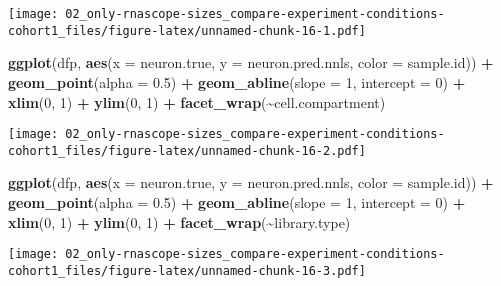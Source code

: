 \documentclass[
]{article}
\newenvironment{Shaded}{\begin{snugshade}}{\end{snugshade}}
\newcommand{\AttributeTok}[1]{\textcolor[rgb]{0.13,0.29,0.53}{#1}}
\newcommand{\DecValTok}[1]{\textcolor[rgb]{0.00,0.00,0.81}{#1}}
\newcommand{\FloatTok}[1]{\textcolor[rgb]{0.00,0.00,0.81}{#1}}
\newcommand{\FunctionTok}[1]{\textcolor[rgb]{0.13,0.29,0.53}{\textbf{#1}}}
\newcommand{\NormalTok}[1]{#1}
\newcommand{\SpecialCharTok}[1]{\textcolor[rgb]{0.81,0.36,0.00}{\textbf{#1}}}
\begin{document}
\texttt{[image: 02\_only-rnascope-sizes\_compare-experiment-conditions-cohort1\_files/figure-latex/unnamed-chunk-16-1.pdf]}

\begin{Shaded}
\begin{Highlighting}[]
\FunctionTok{ggplot}\NormalTok{(dfp, }\FunctionTok{aes}\NormalTok{(}\AttributeTok{x =}\NormalTok{ neuron.true, }\AttributeTok{y =}\NormalTok{ neuron.pred.nnls, }\AttributeTok{color =}\NormalTok{ sample.id)) }\SpecialCharTok{+} 
  \FunctionTok{geom\_point}\NormalTok{(}\AttributeTok{alpha =} \FloatTok{0.5}\NormalTok{) }\SpecialCharTok{+} \FunctionTok{geom\_abline}\NormalTok{(}\AttributeTok{slope =} \DecValTok{1}\NormalTok{, }\AttributeTok{intercept =} \DecValTok{0}\NormalTok{) }\SpecialCharTok{+}
  \FunctionTok{xlim}\NormalTok{(}\DecValTok{0}\NormalTok{, }\DecValTok{1}\NormalTok{) }\SpecialCharTok{+} \FunctionTok{ylim}\NormalTok{(}\DecValTok{0}\NormalTok{, }\DecValTok{1}\NormalTok{) }\SpecialCharTok{+} \FunctionTok{facet\_wrap}\NormalTok{(}\SpecialCharTok{\textasciitilde{}}\NormalTok{cell.compartment)}
\end{Highlighting}
\end{Shaded}

\texttt{[image: 02\_only-rnascope-sizes\_compare-experiment-conditions-cohort1\_files/figure-latex/unnamed-chunk-16-2.pdf]}

\begin{Shaded}
\begin{Highlighting}[]
\FunctionTok{ggplot}\NormalTok{(dfp, }\FunctionTok{aes}\NormalTok{(}\AttributeTok{x =}\NormalTok{ neuron.true, }\AttributeTok{y =}\NormalTok{ neuron.pred.nnls, }\AttributeTok{color =}\NormalTok{ sample.id)) }\SpecialCharTok{+} 
  \FunctionTok{geom\_point}\NormalTok{(}\AttributeTok{alpha =} \FloatTok{0.5}\NormalTok{) }\SpecialCharTok{+} \FunctionTok{geom\_abline}\NormalTok{(}\AttributeTok{slope =} \DecValTok{1}\NormalTok{, }\AttributeTok{intercept =} \DecValTok{0}\NormalTok{) }\SpecialCharTok{+}
  \FunctionTok{xlim}\NormalTok{(}\DecValTok{0}\NormalTok{, }\DecValTok{1}\NormalTok{) }\SpecialCharTok{+} \FunctionTok{ylim}\NormalTok{(}\DecValTok{0}\NormalTok{, }\DecValTok{1}\NormalTok{) }\SpecialCharTok{+} \FunctionTok{facet\_wrap}\NormalTok{(}\SpecialCharTok{\textasciitilde{}}\NormalTok{library.type)}
\end{Highlighting}
\end{Shaded}

\texttt{[image: 02\_only-rnascope-sizes\_compare-experiment-conditions-cohort1\_files/figure-latex/unnamed-chunk-16-3.pdf]}
\end{document}
